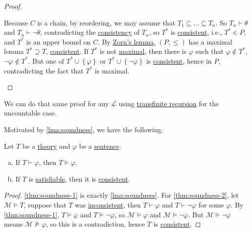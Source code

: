 \begin{proof}
\begin{explanation}
		Because \(C\) is a chain, by reordering, we may assume that \(T_1 \subseteq \ldots \subseteq T_n\). So \(T_n \vdash \theta \) and \(T_n \vdash \lnot \theta \), contradicting the \hyperref[def:consistent]{consistency} of \(T_n\), so \(T^{\ast} \) is \hyperref[def:consistent]{consistent}, i.e., \(T^{\ast} \in P\), and \(T^{\ast} \) is an upper bound on \(C\). By \hyperref[thm:zorn]{Zorn's lemma}, \((P, \leq )\)  has a maximal lemma \(T^{\ast} \supseteq T \), \hyperref[def:consistent]{consistent}. If \(T^{\ast} \) is not \hyperref[def:maximal]{maximal}, then there is \(\varphi \) such that \(\varphi \notin T^{\ast} \), \(\lnot \varphi \notin T^{\ast} \). But one of \(T^{\ast} \cup \left\{ \varphi  \right\} \) or \(T^{\ast} \cup \left\{ \lnot \varphi  \right\} \) is \hyperref[def:consistent]{consistent}, hence in \(P\), contradicting the fact that \(T^{\ast} \) is maximal.
	\end{explanation}
\end{proof}

\begin{remark}
	We can do that same proof for any \(\mathcal{L} \) using \href{https://en.wikipedia.org/wiki/Transfinite_induction}{transfinite recursion} for the uncountable case.
\end{remark}

Motivated by \autoref{lma:soundness}, we have the following.

\begin{theorem}[Soundness]\label{thm:soundness}
	Let \(T\) be a \hyperref[def:theory]{theory} and \(\varphi \) be a \hyperref[def:sentence]{sentence}.
	\begin{enumerate}[(a)]
		\item\label{thm:soundness-1} If \(T \vdash \varphi \), then \(T \models \varphi \).
		\item\label{thm:soundness-2} If \(T\) is \hyperref[def:satisfiable]{satisfiable}, then it is \hyperref[def:consistent]{consistent}.
	\end{enumerate}
\end{theorem}
\begin{proof}
	\autoref{thm:soundness-1} is exactly \autoref{lma:soundness}. For \autoref{thm:soundness-2}, let \(\mathcal{M} \models T\), suppose that \(T\) was \hyperref[def:inconsistent]{inconsistent}, then \(T\vdash \varphi \) and \(T\vdash \lnot \varphi \) for some \(\varphi \). By \autoref{thm:soundness-1}, \(T \models \varphi \) and \(T \models \lnot \varphi \), so \(\mathcal{M} \models \varphi \) and \(\mathcal{M} \models \lnot \varphi \). But \(\mathcal{M} \models \lnot \varphi \) means \(\mathcal{M} \not \models \varphi \), so this is a contradiction, hence \(T\) is \hyperref[def:consistent]{consistent}.
\end{proof}

